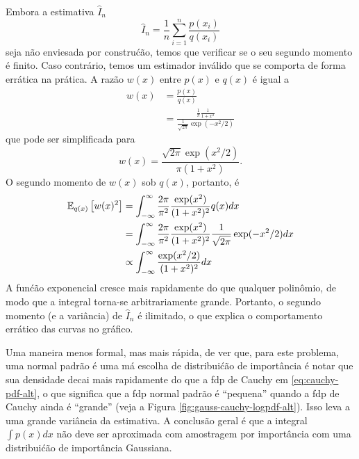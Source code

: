 \begin{solution}
    Embora a estimativa $\hat{I}_n$
    \begin{equation}
        \hat{I}_n =  \frac{1}{n} \sum_{i=1}^n \frac{p(x_i)}{q(x_i)}
    \end{equation}
    seja n\~ao enviesada por constru\'c\~ao, temos que verificar se o seu segundo
    momento \'e finito. Caso contr\'ario, temos um estimador inv\'alido que
    se comporta de forma err\'atica na pr\'atica. A raz\~ao $w(x)$ entre $p(x)$ e
    $q(x)$ \'e igual a
    \begin{align}
        w(x) & = \frac{p(x)}{q(x)}\\
        & = \frac{\frac{1}{\pi}\frac{1}{1+x^2}}{ \frac{1}{\sqrt{2\pi}}\exp(-x^2/2)}
    \end{align}
    que pode ser simplificada para
    \begin{equation}
        w(x)  = \frac{\sqrt{2\pi}\exp(x^2/2)}{\pi(1+x^2)}.
    \end{equation}
    O segundo momento de $w(x)$ sob $q(x)$, portanto, \'e
    \begin{align}
        \mathbb{E}_{q(x)}\left[w(x)^2\right] & = \int_{-\infty}^\infty \frac{2\pi}{\pi^2} \frac{\exp(x^2)}{(1+x^2)^2} q(x) dx\\
        & = \int_{-\infty}^\infty \frac{2\pi}{\pi^2} \frac{\exp(x^2)}{(1+x^2)^2} \frac{1}{\sqrt{2\pi}} \exp(-x^2/2) dx\\
        & \propto \int_{-\infty}^\infty \frac{\exp(x^2/2)}{(1+x^2)^2} dx
    \end{align}
    A fun\'c\~ao exponencial cresce mais rapidamente do que qualquer polin\^omio, de
    modo que a integral torna-se arbitrariamente grande. Portanto, o segundo
    momento (e a vari\^ancia) de $\hat{I}_n$ \'e ilimitado, o que
    explica o comportamento err\'atico das curvas no gr\'afico.
    
    Uma maneira menos formal, mas mais r\'apida, de ver que, para este problema, uma
    normal padr\~ao \'e uma m\'a escolha de distribui\'c\~ao de import\^ancia \'e
    notar que sua densidade decai mais rapidamente do que a fdp de Cauchy em
    \eqref{eq:cauchy-pdf-alt}, o que significa que a fdp normal padr\~ao \'e
    ``pequena'' quando a fdp de Cauchy ainda \'e ``grande'' (veja a Figura
    \ref{fig:gauss-cauchy-logpdf-alt}). Isso leva a uma grande vari\^ancia da
    estimativa. A conclus\~ao geral \'e que a integral $\int p(x) dx$
    n\~ao deve ser aproximada com amostragem por import\^ancia com uma distribui\'c\~ao
    de import\^ancia Gaussiana.
    

\end{solution}
